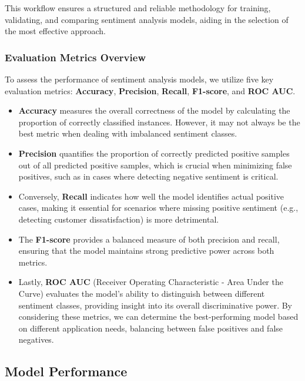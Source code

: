 This workflow ensures a structured and reliable methodology for training, validating, and comparing sentiment analysis models, aiding in the selection of the most effective approach.

\subsubsection{Evaluation Metrics Overview}

To assess the performance of sentiment analysis models, we utilize five key evaluation metrics: \textbf{Accuracy}, \textbf{Precision}, \textbf{Recall}, \textbf{F1-score}, and \textbf{ROC AUC}. 

\begin{itemize}
    \item \textbf{Accuracy} measures the overall correctness of the model by calculating the proportion of correctly classified instances. However, it may not always be the best metric when dealing with imbalanced sentiment classes. 
    
    \item \textbf{Precision} quantifies the proportion of correctly predicted positive samples out of all predicted positive samples, which is crucial when minimizing false positives, such as in cases where detecting negative sentiment is critical. 
    
    \item Conversely, \textbf{Recall} indicates how well the model identifies actual positive cases, making it essential for scenarios where missing positive sentiment (e.g., detecting customer dissatisfaction) is more detrimental.  
    
    \item The \textbf{F1-score} provides a balanced measure of both precision and recall, ensuring that the model maintains strong predictive power across both metrics. 
    
    \item Lastly, \textbf{ROC AUC} (Receiver Operating Characteristic - Area Under the Curve) evaluates the model's ability to distinguish between different sentiment classes, providing insight into its overall discriminative power. By considering these metrics, we can determine the best-performing model based on different application needs, balancing between false positives and false negatives.
\end{itemize}

\subsection{Model Performance}

